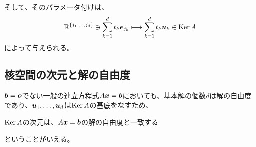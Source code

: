 \documentclass[../../../topic_linear-algebra]{subfiles}
\begin{document}
\br

そして、そのパラメータ付けは、
\begin{equation*}
  \mathbb{R}^{\{ j_1, \dots, j_d \}} \ni \sum_{k=1}^d t_k \vb*{e}_{j_k} \longmapsto \sum_{k=1}^d t_k \vb*{u}_k \in \operatorname{Ker} A
\end{equation*}
によって与えられる。

\subsection{核空間の次元と解の自由度}

$\vb*{b} = \vb*{o}$でない一般の連立方程式$A\vb*{x} = \vb*{b}$においても、\hyperref[sec:degrees-of-freedom]{基本解の個数$d$は解の自由度}であり、$\vb*{u}_1, \ldots, \vb*{u}_d$は$\operatorname{Ker} A$の基底をなすため、
\begin{emphabox}
  \begin{spacebox}
    \begin{center}
      $\operatorname{Ker} A$の次元は、$A\vb*{x} = \vb*{b}$の解の自由度と一致する
    \end{center}
  \end{spacebox}
\end{emphabox}
ということがいえる。
\end{document}
